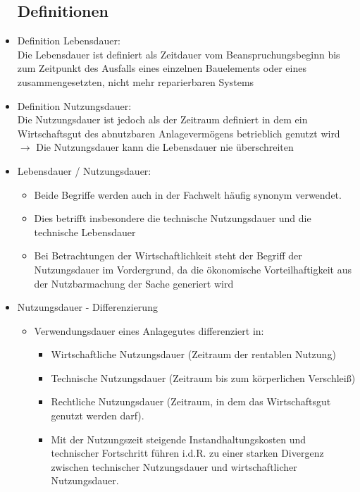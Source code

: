 \documentclass[fleqn,twoside,dvipsnames]{article}
\begin{document}
\begin{itemize}
        \subsection{Definitionen}
            \item Definition Lebensdauer:\\
                Die Lebensdauer ist definiert als Zeitdauer vom Beanspruchungsbeginn bis zum Zeitpunkt des Ausfalls eines einzelnen Bauelements oder eines zusammengesetzten, nicht mehr reparierbaren Systems
            \item Definition Nutzungsdauer:\\
                Die Nutzungsdauer ist jedoch als der Zeitraum definiert in dem ein Wirtschaftsgut des abnutzbaren Anlagevermögens betrieblich genutzt wird $\rightarrow$ Die Nutzungsdauer kann die Lebensdauer nie überschreiten
            \item Lebensdauer / Nutzungsdauer:
                \begin{itemize}
                    \item Beide Begriffe werden auch in der Fachwelt häufig synonym verwendet.
                    \item Dies betrifft insbesondere die technische Nutzungsdauer und die technische Lebensdauer
                    \item Bei Betrachtungen der Wirtschaftlichkeit steht der Begriff der Nutzungsdauer im Vordergrund, da die ökonomische Vorteilhaftigkeit aus
                    der Nutzbarmachung der Sache generiert wird
                \end{itemize}  
            \item Nutzungsdauer - Differenzierung \label{Nutzungsdauertypen}
                \begin{itemize}
                    \item Verwendungsdauer eines Anlagegutes differenziert in:
                        \begin{itemize}
                            \item Wirtschaftliche Nutzungsdauer (Zeitraum der rentablen Nutzung)
                            \item Technische Nutzungsdauer (Zeitraum bis zum körperlichen Verschleiß)
                            \item Rechtliche Nutzungsdauer (Zeitraum, in dem das Wirtschaftsgut genutzt werden darf).
                            \item Mit der Nutzungszeit steigende Instandhaltungskosten und technischer Fortschritt führen i.d.R. zu einer starken Divergenz zwischen technischer Nutzungsdauer und wirtschaftlicher Nutzungsdauer.

\end{itemize}
\end{itemize}
\end{itemize}
\end{document}
